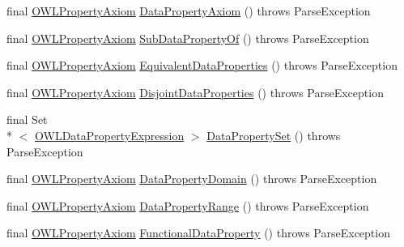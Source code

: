 \begin{DoxyCompactItemize}
\item 
final \hyperlink{interfaceorg_1_1semanticweb_1_1owlapi_1_1model_1_1_o_w_l_property_axiom}{O\-W\-L\-Property\-Axiom} \hyperlink{classorg_1_1coode_1_1owlapi_1_1functionalparser_1_1_o_w_l_functional_syntax_parser_a5e291b16b1a4e94df1398a6e2fdab8fe}{Data\-Property\-Axiom} ()  throws Parse\-Exception 
\item 
final \hyperlink{interfaceorg_1_1semanticweb_1_1owlapi_1_1model_1_1_o_w_l_property_axiom}{O\-W\-L\-Property\-Axiom} \hyperlink{classorg_1_1coode_1_1owlapi_1_1functionalparser_1_1_o_w_l_functional_syntax_parser_a3607f447abf77b5e8a5761e3920a87ce}{Sub\-Data\-Property\-Of} ()  throws Parse\-Exception 
\item 
final \hyperlink{interfaceorg_1_1semanticweb_1_1owlapi_1_1model_1_1_o_w_l_property_axiom}{O\-W\-L\-Property\-Axiom} \hyperlink{classorg_1_1coode_1_1owlapi_1_1functionalparser_1_1_o_w_l_functional_syntax_parser_a95a4881a246b86a7d63c5a8a80ea4c9d}{Equivalent\-Data\-Properties} ()  throws Parse\-Exception 
\item 
final \hyperlink{interfaceorg_1_1semanticweb_1_1owlapi_1_1model_1_1_o_w_l_property_axiom}{O\-W\-L\-Property\-Axiom} \hyperlink{classorg_1_1coode_1_1owlapi_1_1functionalparser_1_1_o_w_l_functional_syntax_parser_a3b770460e67896a39a85231741e07645}{Disjoint\-Data\-Properties} ()  throws Parse\-Exception 
\item 
final Set\\*
$<$ \hyperlink{interfaceorg_1_1semanticweb_1_1owlapi_1_1model_1_1_o_w_l_data_property_expression}{O\-W\-L\-Data\-Property\-Expression} $>$ \hyperlink{classorg_1_1coode_1_1owlapi_1_1functionalparser_1_1_o_w_l_functional_syntax_parser_a47634fcf7ea1ec529d0a97f10349954c}{Data\-Property\-Set} ()  throws Parse\-Exception 
\item 
final \hyperlink{interfaceorg_1_1semanticweb_1_1owlapi_1_1model_1_1_o_w_l_property_axiom}{O\-W\-L\-Property\-Axiom} \hyperlink{classorg_1_1coode_1_1owlapi_1_1functionalparser_1_1_o_w_l_functional_syntax_parser_acd1376404de625ecdb239f26753b85dd}{Data\-Property\-Domain} ()  throws Parse\-Exception 
\item 
final \hyperlink{interfaceorg_1_1semanticweb_1_1owlapi_1_1model_1_1_o_w_l_property_axiom}{O\-W\-L\-Property\-Axiom} \hyperlink{classorg_1_1coode_1_1owlapi_1_1functionalparser_1_1_o_w_l_functional_syntax_parser_a09d8bdb25bbc6a4ebdfe85590ad9104f}{Data\-Property\-Range} ()  throws Parse\-Exception 
\item 
final \hyperlink{interfaceorg_1_1semanticweb_1_1owlapi_1_1model_1_1_o_w_l_property_axiom}{O\-W\-L\-Property\-Axiom} \hyperlink{classorg_1_1coode_1_1owlapi_1_1functionalparser_1_1_o_w_l_functional_syntax_parser_a854c575d75fa5ce0cc50eba6f34f33ab}{Functional\-Data\-Property} ()  throws Parse\-Exception 

\end{DoxyCompactItemize}

